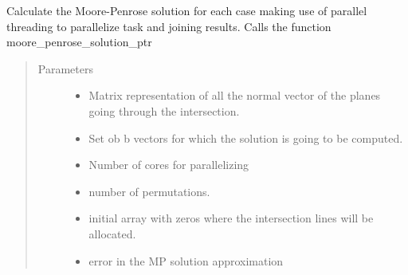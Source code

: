 \documentclass[letterpaper,12pt,english]{sphinxmanual}
\begin{document}
\begin{fulllineitems}
\label{\detokenize{functions:functions.mooore_penrose_solution_par}}
Calculate the Moore-Penrose solution for each case making use of parallel threading to parallelize task
and joining results. Calls the function moore\_penrose\_solution\_ptr
\begin{quote}\begin{description}
\item[{Parameters}] \leavevmode\begin{itemize}
\item {} 
 \textendash{} Matrix representation of all the normal vector of the planes going through the intersection.

\item {} 
 \textendash{} Set ob b vectors for which the solution is going to be computed.

\item {} 
 \textendash{} Number of cores for parallelizing

\item {} 
 \textendash{} number of permutations.

\item {} 
 \textendash{} initial array with zeros where the intersection lines will be allocated.

\item {} 
 \textendash{} error in the MP solution approximation

\end{itemize}

\end{description}\end{quote}

\end{fulllineitems}

\end{document}
